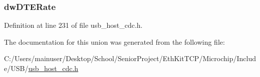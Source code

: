 \subsubsection[{dw\+D\+T\+E\+Rate}]{ dw\+D\+T\+E\+Rate}\label{union___u_s_b___c_d_c___l_i_n_e___c_o_d_i_n_g_a3f19594f07e3ee40f13461244d422caa}


Definition at line 231 of file usb\+\_\+host\+\_\+cdc.\+h.



The documentation for this union was generated from the following file\+:\begin{DoxyCompactItemize}
\item 
C\+:/\+Users/mainuser/\+Desktop/\+School/\+Senior\+Project/\+Eth\+Kit\+T\+C\+P/\+Microchip/\+Include/\+U\+S\+B/\hyperlink{usb__host__cdc_8h}{usb\+\_\+host\+\_\+cdc.\+h}\end{DoxyCompactItemize}
